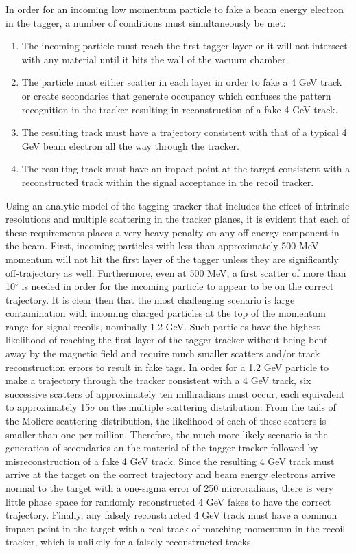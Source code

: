 In order for an incoming low momentum particle to fake a beam energy electron in the tagger, a number of conditions must simultaneously be met:
\begin{enumerate}
\item The incoming particle must reach the first tagger layer or it will not intersect with any material until it hits the wall of the vacuum chamber.
\item The particle must either scatter in each layer in order to fake a 4 GeV track or create secondaries that generate occupancy which confuses the pattern recognition in the tracker resulting in reconstruction of a fake 4 GeV track.
\item The resulting track must have a trajectory consistent with that of a typical 4 GeV beam electron all the way through the tracker.
\item The resulting track must have an impact point at the target consistent with a reconstructed track within the signal acceptance in the recoil tracker. 
\end{enumerate}
Using an analytic model of the tagging tracker that includes the effect of intrinsic resolutions and multiple scattering in the tracker planes, it is evident that each of these requirements places a very heavy penalty on any off-energy component in the beam.  First, incoming particles with less than approximately 500 MeV momentum will not hit the first layer of the tagger unless they are significantly off-trajectory as well.  Furthermore, even at 500 MeV, a first scatter of more than 10$^\circ$ is needed in order for the incoming particle to appear to be on the correct trajectory. It is clear then that the most challenging scenario is large contamination with incoming charged particles at the top of the momentum range for signal recoils, nominally 1.2 GeV.  Such particles have the highest likelihood of reaching the first layer of the tagger tracker without being bent away by the magnetic field and require much smaller scatters and/or track reconstruction errors to result in fake tags. In order for a 1.2 GeV particle to make a trajectory through the tracker consistent with a 4 GeV track, six successive scatters of approximately ten milliradians must occur, each equivalent to approximately 15$\sigma$ on the multiple scattering distribution. From the tails of the Moliere scattering distribution, the likelihood of each of these scatters is smaller than one per million.  Therefore, the much more likely scenario is the generation of secondaries an the material of the tagger tracker followed by misreconstruction of a fake 4 GeV track.  Since the resulting 4 GeV track must arrive at the target on the correct trajectory and beam energy electrons arrive normal to the target with a one-sigma error of 250 microradians, there is very little phase space for randomly reconstructed 4 GeV fakes to have the correct trajectory.  Finally, any falsely reconstructed 4 GeV track must have a common impact point in the target with a real track of matching momentum in the recoil tracker, which is unlikely for a falsely reconstructed tracks.

